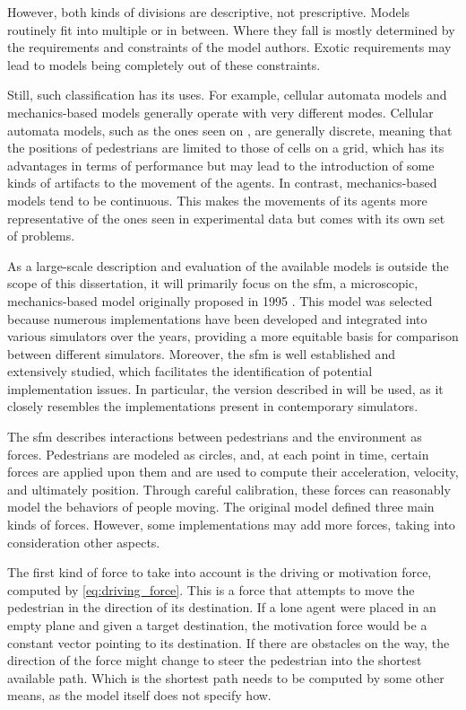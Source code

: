 \documentclass[twoside, 11pt]{article}
\begin{document}
However, both kinds of divisions are descriptive, not prescriptive. Models routinely fit into multiple or in between. Where they fall is mostly determined by the requirements and constraints of the model authors. Exotic requirements may lead to models being completely out of these constraints.

Still, such classification has its uses. For example, cellular automata models and mechanics-based models generally operate with very different modes. Cellular automata models, such as the ones seen on \cite{HUANG2017417}, are generally discrete, meaning that the positions of pedestrians are limited to those of cells on a grid, which has its advantages in terms of performance but may lead to the introduction of some kinds of artifacts to the movement of the agents. In contrast, mechanics-based models tend to be continuous. This makes the movements of its agents more representative of the ones seen in experimental data but comes with its own set of problems.

As a large-scale description and evaluation of the available models is outside the scope of this dissertation, it will primarily focus on the \gls{sfm}, a microscopic, mechanics-based model originally proposed in 1995 \cite{helbingSocialForceModel1995}. This model was selected because numerous implementations have been developed and integrated into various simulators over the years, providing a more equitable basis for comparison between different simulators. Moreover, the \gls{sfm} is well established and extensively studied, which facilitates the identification of potential implementation issues. In particular, the version described in \cite{helbingSimulatingDynamicFeatures2000} will be used, as it closely resembles the implementations present in contemporary simulators.

The \gls{sfm} describes interactions between pedestrians and the environment as forces. Pedestrians are modeled as circles, and, at each point in time, certain forces are applied upon them and are used to compute their acceleration, velocity, and ultimately position. Through careful calibration, these forces can reasonably model the behaviors of people moving. The original model defined three main kinds of forces. However, some implementations may add more forces, taking into consideration other aspects.

The first kind of force to take into account is the driving or motivation force, computed by \autoref{eq:driving_force}. This is a force that attempts to move the pedestrian in the direction of its destination. If a lone agent were placed in an empty plane and given a target destination, the motivation force would be a constant vector pointing to its destination. If there are obstacles on the way, the direction of the force might change to steer the pedestrian into the shortest available path. Which is the shortest path needs to be computed by some other means, as the model itself does not specify how.
\end{document}
